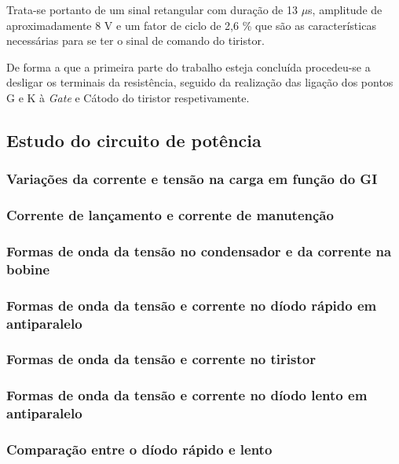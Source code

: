 \documentclass[a4paper,11pt]{article}
\numberwithin{equation}{section}
\begin{document}
Trata-se portanto de um sinal retangular com duração de 13 $\mu$s, amplitude de aproximadamente 8 V e um fator de ciclo de 2,6 \% que são as características necessárias para se ter o sinal de comando do tiristor.

De forma a que a primeira parte do trabalho esteja concluída procedeu-se a desligar os terminais da resistência, seguido da realização das ligação dos pontos G e K à \textit{Gate} e Cátodo do tiristor respetivamente.

\subsection{Estudo do circuito de potência}

\subsubsection{Variações da corrente e tensão na carga em função do GI}

\subsubsection{Corrente de lançamento e corrente de manutenção}

\subsubsection{Formas de onda da tensão no condensador e da corrente na bobine}

\subsubsection{Formas de onda da tensão e corrente no díodo rápido em antiparalelo}

\subsubsection{Formas de onda da tensão e corrente no tiristor}

\subsubsection{Formas de onda da tensão e corrente no díodo lento em antiparalelo}

\subsubsection{Comparação entre o díodo rápido e lento}
\end{document}

